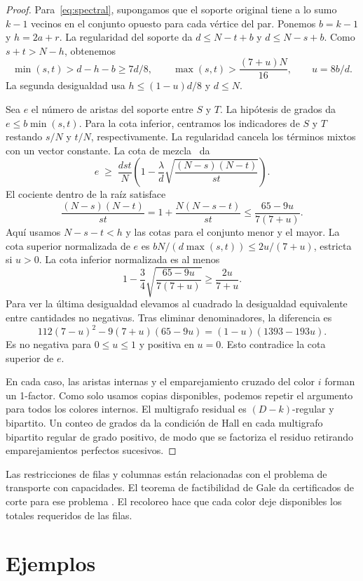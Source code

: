 \documentclass[11pt]{article}
\begin{document}
\begin{proof}
Para~\eqref{eq:spectral}, supongamos que el soporte original tiene a lo sumo \(k-1\) vecinos en el conjunto opuesto para cada vértice del par. Ponemos \(b=k-1\) y \(h=2a+r\). La regularidad del soporte da \(d\le N-t+b\) y \(d\le N-s+b\). Como \(s+t>N-h\), obtenemos
\[
 \min(s,t)>d-h-b\ge 7d/8,\qquad
 \max(s,t)>\frac{(7+u)N}{16},\qquad u=8b/d.
\]
La segunda desigualdad usa \(h\le (1-u)d/8\) y \(d\le N\).

Sea \(e\) el número de aristas del soporte entre \(S\) y \(T\). La hipótesis de grados da \(e\le b\min(s,t)\). Para la cota inferior, centramos los indicadores de \(S\) y \(T\) restando \(s/N\) y \(t/N\), respectivamente. La regularidad cancela los términos mixtos con un vector constante. La cota de mezcla~\cite{Haemers} da
\[
 e\;\ge\;\frac{dst}{N}
 \left(1-\frac{\lambda}{d}\sqrt{\frac{(N-s)(N-t)}{st}}\right).
\]
El cociente dentro de la raíz satisface
\[
 \frac{(N-s)(N-t)}{st}
 =1+\frac{N(N-s-t)}{st}
 \le \frac{65-9u}{7(7+u)} .
\]
Aquí usamos \(N-s-t<h\) y las cotas para el conjunto menor y el mayor. La cota superior normalizada de \(e\) es \(bN/(d\max(s,t))\le 2u/(7+u)\), estricta si \(u>0\). La cota inferior normalizada es al menos
\[
 1-\frac34\sqrt{\frac{65-9u}{7(7+u)}}\ge \frac{2u}{7+u}.
\]
Para ver la última desigualdad elevamos al cuadrado la desigualdad equivalente entre cantidades no negativas. Tras eliminar denominadores, la diferencia es
\[
 112(7-u)^2-9(7+u)(65-9u)=(1-u)(1393-193u).
\]
Es no negativa para \(0\le u\le1\) y positiva en \(u=0\). Esto contradice la cota superior de \(e\).

En cada caso, las aristas internas y el emparejamiento cruzado del color \(i\) forman un 1-factor. Como solo usamos copias disponibles, podemos repetir el argumento para todos los colores internos. El multigrafo residual es \((D-k)\)-regular y bipartito. Un conteo de grados da la condición de Hall en cada multigrafo bipartito regular de grado positivo, de modo que se factoriza el residuo retirando emparejamientos perfectos sucesivos.
\end{proof}

Las restricciones de filas y columnas están relacionadas con el problema de transporte con capacidades. El teorema de factibilidad de Gale da certificados de corte para ese problema \cite{Gale}. El recoloreo hace que cada color deje disponibles los totales requeridos de las filas.

\section{Ejemplos}\label{sec:examples}
\end{document}
